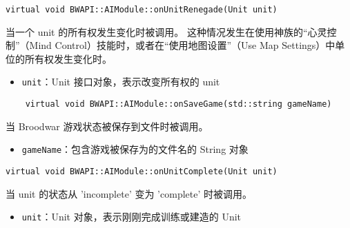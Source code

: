 \begin{tcolorbox}[colback=white, colframe=black!60!white, title=onUnitRenegade(), arc=0mm]
\begin{verbatim}
virtual void BWAPI::AIModule::onUnitRenegade(Unit unit)
\end{verbatim}
当一个 unit 的所有权发生变化时被调用。  
这种情况发生在使用神族的“心灵控制”（Mind Control）技能时，或者在“使用地图设置”（Use Map Settings）中单位的所有权发生变化时。
\begin{parameter}
    \begin{itemize}
        \item \texttt{unit}：Unit 接口对象，表示改变所有权的 unit
    \end{itemize}
\end{parameter}
\end{tcolorbox}
\begin{tcolorbox}[colback=white, colframe=black!60!white, title=onSaveGame(), arc=0mm]
    \begin{verbatim}
    virtual void BWAPI::AIModule::onSaveGame(std::string gameName)
    \end{verbatim}
    当 Broodwar 游戏状态被保存到文件时被调用。
    \begin{parameter}
        \begin{itemize}
            \item \texttt{gameName}：包含游戏被保存为的文件名的 String 对象
        \end{itemize}
    \end{parameter}
\end{tcolorbox}

\begin{tcolorbox}[colback=white, colframe=black!60!white, title=onUnitComplete(), arc=0mm]
\begin{verbatim}
virtual void BWAPI::AIModule::onUnitComplete(Unit unit)
\end{verbatim}
当 unit 的状态从 'incomplete' 变为 'complete' 时被调用。
\begin{parameter}
    \begin{itemize}
        \item \texttt{unit}：Unit 对象，表示刚刚完成训练或建造的 Unit
    \end{itemize}
\end{parameter}
\end{tcolorbox}
